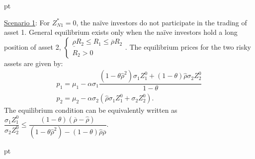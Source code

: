 \documentclass[10pt]{article}
\begin{document}
 pt

\underline{Scenario 1}: For $ Z_{N 1}^* = 0 $, the na\"ive investors do not participate in the trading of asset 1. General equilibrium exists only when the na\"ive investors hold a long position of asset 2, $ \left\{ \begin{matrix} \underline{\rho} R_2 \leqslant R_1 \leqslant \overline{\rho} R_2 \\ R_2 > 0 \end{matrix} \right. $. The equilibrium prices for the two risky assets are given by:
\begin{eqnarray}
& p_1 = \mu_1 - \alpha \sigma_1 \dfrac{(1 - \theta {\hat \rho}^2) \sigma_1 Z_1^0 + (1 - \theta) {\hat \rho} \sigma_2 Z_2^0}{1 - \theta} & \\
& p_2 = \mu_2 - \alpha \sigma_2 ({\hat \rho} \sigma_1 Z_1^0 + \sigma_2 Z_2^0). &
\end{eqnarray}
The equilibrium condition can be equivalently written as $ \dfrac{\sigma_1 Z_1^0}{\sigma_2 Z_2^0} \leqslant \dfrac{(1 - \theta) (\overline{\rho} - {\hat \rho})}{(1 - \theta {\hat \rho}^2) - (1 - \theta) {\hat \rho} \overline{\rho}} $.

 pt
\end{document}
